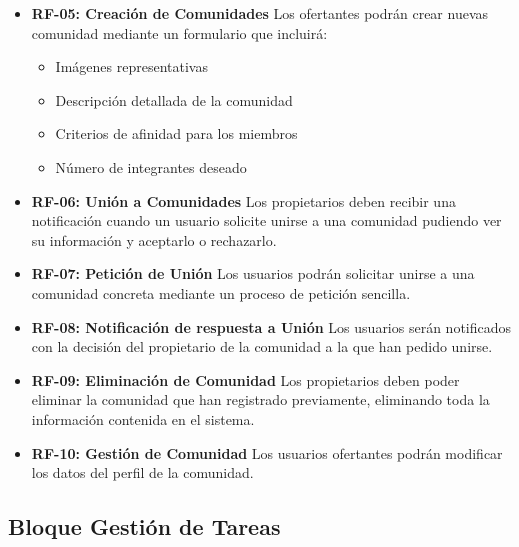 \begin{itemize}
    \item \textbf{RF-05: Creación de Comunidades}  
    Los ofertantes podrán crear nuevas comunidad mediante un formulario que incluirá:
    \begin{itemize}
        \item Imágenes representativas
        \item Descripción detallada de la comunidad
        \item Criterios de afinidad para los miembros
        \item Número de integrantes deseado
    \end{itemize}
    
    \item \textbf{RF-06: Unión a Comunidades}  
    Los propietarios deben recibir una notificación cuando un usuario solicite unirse a una comunidad pudiendo ver su información y aceptarlo o rechazarlo.

    \item \textbf{RF-07: Petición de Unión}  
    Los usuarios podrán solicitar unirse a una comunidad concreta mediante un proceso de petición sencilla.

    \item \textbf{RF-08: Notificación de respuesta a Unión}  
    Los usuarios serán notificados con la decisión del propietario de la comunidad a la que han pedido unirse.

    \item \textbf{RF-09: Eliminación de Comunidad}  
    Los propietarios deben poder eliminar la comunidad que han registrado previamente, eliminando toda la información contenida en el sistema.

    \item \textbf{RF-10: Gestión de Comunidad}  
    Los usuarios ofertantes podrán modificar los datos del perfil de la comunidad.


    
\end{itemize}

\subsection{Bloque Gestión de Tareas}

